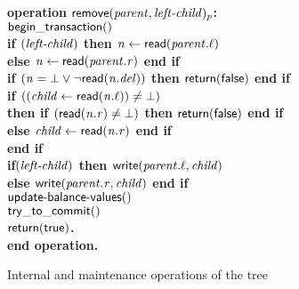 \begin{figure}[h!]
{{\begin{minipage}[t]{150mm}
\begin{tabbing}
		
\bf{operation} $\act{remove}(\ms{parent}, \ms{left-child})_p$: \\
		 \> $\lit{begin\_transaction}()$ \\
		 \> \bf{if} $(\ms{left-child})$ \bf{then} $\ms{n} \gets \lit{read}(\ms{parent.\ell})$ \\
		 \>\> \bf{else} $\ms{n} \gets \lit{read}(\ms{parent.r})$ \bf{end if} \\
		 \> \bf{if} $(\ms{n = \bot} \vee \neg\lit{read}(\ms{n.del}))$ \bf{then} ${\sf return}(\lit{false})$ \bf{end if} \\	
		 \> \bf{if} $((\ms{child} \gets \lit{read}(\ms{n.\ell})) \neq \bot)$ \\
		 \>\> \bf{then if} $(\lit{read}(\ms{n.r}) \neq \bot)$ \bf{then} ${\sf return}(\lit{false})$ \bf{end if} \\%
		 \>\> \bf{else} $\ms{child} \gets \lit{read}(\ms{n.r})$ {\bf end if} \\
		 \> \bf{end if} \\
		 \> \bf{if}$(\ms{left-child})$ \bf{then} $\lit{write}(\ms{parent.\ell}, \ms{child})$ \\%
		 \>\> \bf{else} $\lit{write}(\ms{parent.r}, \ms{child})$ \bf{end if} \\%
		 \> $\act{update-balance-values()}$ \\%
		 \> $\lit{try\_to\_commit}()$ \\
		 \> $\sf{return}(\lit{true})$. \\
		{\bf end operation}.
		

\end{tabbing}
\normalsize
\end{minipage}
}
\caption{Internal and maintenance operations of the tree}
\label{fig:tree-maintenance}
}
\end{figure}